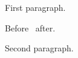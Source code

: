 \documentclass{article}
\begin{document}
First paragraph.

Before \lxubd\ after.

Second paragraph.
\end{document}
